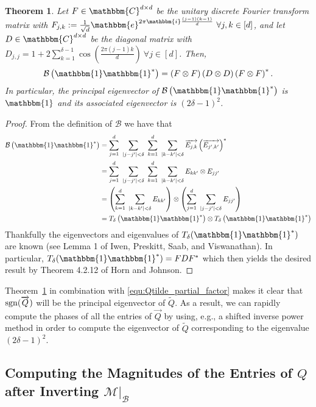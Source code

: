 \documentclass[]{spie}  %
\newtheorem{thm}{Theorem}
\def \vec{\overrightarrow}
\def \B {\mathcal{B}}
\def \one { \mathbbm{1}}
\def \e { \mathbbm{e}}
\def \i { \mathbbm{i}}
\def \sgn {{\rm sgn}}
\begin{document}
\begin{thm} 
Let $F \in \mathbbm{C}^{d \times d}$ be the unitary discrete Fourier transform matrix with $F_{j,k} := \frac{1}{\sqrt{d}} \e^{2 \pi \i \frac{(j-1)(k-1)}{d}} ~\forall j,k \in [d]$, and let $D \in \mathbbm{C}^{d \times d}$ be the diagonal matrix with $D_{j,j} = 1 + 2 \sum^{\delta-1}_{k=1} \cos \left( \frac{2 \pi (j-1)k}{d} \right)~\forall j \in [d]$.  Then,
$$\B \left( \one \one^* \right) = \left( F \otimes F \right) \left( D \otimes D \right) \left( F \otimes F \right)^*.$$
In particular, the principal eigenvector of $\B \left( \one \one^* \right)$ is $\one$ and its associated eigenvector is $(2 \delta - 1)^2$. 
\label{thm:Factorized_P11}
\end{thm}

\begin{proof}
From the definition of $\B$ we have that 
\begin{align*}
  \B \left( \one \one^* \right) &= \sum^d_{j=1} ~\sum_{|j - j'| < \delta} ~\sum^d_{k=1} ~\sum_{|k - k'| < \delta}\vec{E_{j,k}} \left(\vec{E_{j',k'}} \right)^* \\
  &= \sum^d_{j=1} ~\sum_{|j - j'| < \delta} ~\sum^d_{k=1} ~\sum_{|k - k'| < \delta} E_{kk'} \otimes E_{jj'} \\
  &= \left(\sum^d_{k=1} ~\sum_{|k - k'| < \delta} E_{kk'}\right) \otimes \left( \sum^d_{j=1} ~\sum_{|j - j'| < \delta} E_{jj'} \right) \\
  &= T_\delta\left(\one \one^*\right) \otimes T_\delta \left(\one \one^*\right)
\end{align*}
Thankfully the eigenvectors and eigenvalues of $T_\delta(\one \one^*)$ are known (see Lemma 1 of Iwen, Preskitt, Saab, and Viswanathan\cite{iwen2016phase}).  In particular, $T_\delta(\one \one^*) = F D F^*$ which then yields the desired result by Theorem 4.2.12 of Horn and Johnson\cite{horn1991topics}.
\end{proof}

Theorem~\ref{thm:Factorized_P11} in combination with \eqref{equ:Qtilde_partial_factor} makes it clear that $\sgn (\vec{Q})$ will be the principal eigenvector of $\widetilde{Q}$.  As a result, we can rapidly compute the phases of all the entries of $\vec{Q}$ by using, e.g., a shifted inverse power method\cite{trefethen1997numerical} in order to compute the eigenvector of $\widetilde{Q}$ corresponding to the eigenvalue $(2 \delta - 1)^2$. 

\subsection{Computing the Magnitudes of the Entries of $Q$ after Inverting $\mathcal{M} \big|_{\B}$}
\label{sec:Getmags}
\end{document}
